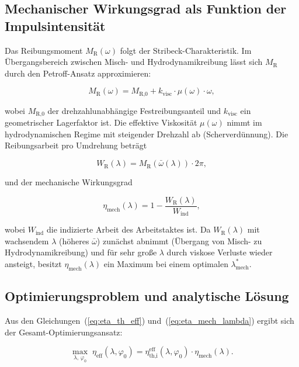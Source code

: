 ﻿\documentclass[a4paper,12pt]{article}
\begin{document}
\subsection{Mechanischer Wirkungsgrad als Funktion der Impulsintensität}

Das Reibungsmoment $M_\text{R}(\omega)$ folgt der Stribeck-Charakteristik.
Im Übergangsbereich zwischen Misch- und Hydrodynamikreibung lässt sich
$M_\text{R}$ durch den Petroff-Ansatz approximieren:

\begin{equation}
  M_\text{R}(\omega) = M_\text{R,0} + k_\text{visc} \cdot \mu(\omega) \cdot \omega,
  \label{eq:mreib}
\end{equation}

\noindent
wobei $M_\text{R,0}$ der drehzahlunabhängige Festreibungsanteil und
$k_\text{visc}$ ein geometrischer Lagerfaktor ist. Die effektive Viskosität
$\mu(\omega)$ nimmt im hydrodynamischen Regime mit steigender Drehzahl ab
(Scherverdünnung). Die Reibungsarbeit pro Umdrehung beträgt

\begin{equation}
  W_\text{R}(\lambda) = M_\text{R}\!\left(\bar{\omega}(\lambda)\right) \cdot 2\pi,
  \label{eq:wreib}
\end{equation}

und der mechanische Wirkungsgrad

\begin{equation}
  \eta_\text{mech}(\lambda) = 1 - \frac{W_\text{R}(\lambda)}{W_\text{ind}},
  \label{eq:eta_mech_lambda}
\end{equation}

\noindent
wobei $W_\text{ind}$ die indizierte Arbeit des Arbeitstaktes ist. Da
$W_\text{R}(\lambda)$ mit wachsendem $\lambda$ (höheres $\bar\omega$) zunächst
abnimmt (Übergang von Misch- zu Hydrodynamikreibung) und für sehr große $\lambda$
durch viskose Verluste wieder ansteigt, besitzt $\eta_\text{mech}(\lambda)$
ein Maximum bei einem optimalen $\lambda^*_\text{mech}$.

\subsection{Optimierungsproblem und analytische Lösung}

Aus den Gleichungen~(\ref{eq:eta_th_eff}) und~(\ref{eq:eta_mech_lambda}) ergibt sich
der Gesamt-Optimierungsansatz:

\begin{equation}
  \max_{\lambda,\, \varphi_0} \;
  \eta_\text{eff}(\lambda, \varphi_0)
  = \eta_\text{th,i}^\text{eff}(\lambda, \varphi_0)
    \cdot \eta_\text{mech}(\lambda).
  \label{eq:opt_problem}
\end{equation}
\end{document}
